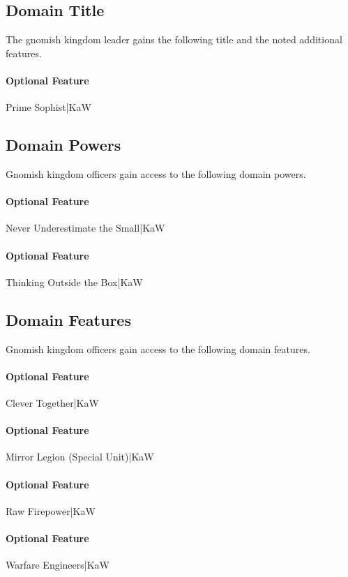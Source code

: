 \documentclass[10pt,a4paper,twoside,bg=print,twocolumn,openany,nodeprecatedcode]{dndbook}
\begin{document}
\subsection{Domain Title}
The gnomish kingdom leader gains the following title and the noted additional features.

\paragraph{Optional Feature}
Prime Sophist|KaW

\subsection{Domain Powers}
Gnomish kingdom officers gain access to the following domain powers.

\paragraph{Optional Feature}
Never Underestimate the Small|KaW

\paragraph{Optional Feature}
Thinking Outside the Box|KaW

\subsection{Domain Features}
Gnomish kingdom officers gain access to the following domain features.

\paragraph{Optional Feature}
Clever Together|KaW

\paragraph{Optional Feature}
Mirror Legion (Special Unit)|KaW

\paragraph{Optional Feature}
Raw Firepower|KaW

\paragraph{Optional Feature}
Warfare Engineers|KaW
\end{document}

